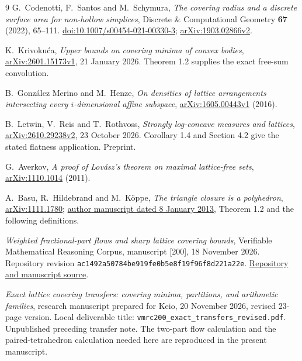 \documentclass[11pt,a4paper]{article}
\theoremstyle{remark}\newtheorem{remark}[theorem]{Remark}
\begin{document}
\begin{thebibliography}{9}
G.~Codenotti, F.~Santos and M.~Schymura,
\emph{The covering radius and a discrete surface area for non-hollow
simplices}, Discrete \& Computational Geometry \textbf{67} (2022),
65--111. \href{https://doi.org/10.1007/s00454-021-00330-3}
{doi:10.1007/s00454-021-00330-3};
\href{https://arxiv.org/abs/1903.02866v2}{arXiv:1903.02866v2}.

K.~Krivoku\'ca, \emph{Upper bounds on covering minima of convex bodies},
\href{https://arxiv.org/abs/2601.15173v1}{arXiv:2601.15173v1},
21 January 2026. Theorem 1.2 supplies the exact free-sum convolution.

B.~Gonz\'alez Merino and M.~Henze,
\emph{On densities of lattice arrangements intersecting every
$i$-dimensional affine subspace},
\href{https://arxiv.org/abs/1605.00443v1}{arXiv:1605.00443v1} (2016).

B.~Letwin, V.~Reis and T.~Rothvoss,
\emph{Strongly log-concave measures and lattices},
\href{https://arxiv.org/abs/2610.29238v2}{arXiv:2610.29238v2},
23 October 2026. Corollary 1.4 and Section 4.2 give the stated
flatness application. Preprint.

G.~Averkov, \emph{A proof of Lov\'asz's theorem on maximal
lattice-free sets},
\href{https://arxiv.org/abs/1110.1014}{arXiv:1110.1014} (2011).

A.~Basu, R.~Hildebrand and M.~K\"oppe,
\emph{The triangle closure is a polyhedron},
\href{https://arxiv.org/abs/1111.1780}{arXiv:1111.1780};
\href{https://www.ams.jhu.edu/~abasu9/papers/polyhedrality_of_triangles.pdf}
{author manuscript dated 8 January 2013}, Theorem 1.2 and the
following definitions.

\emph{Weighted fractional-part flows and sharp lattice covering bounds},
Verifiable Mathematical Reasoning Corpus, manuscript [200],
18 November 2026. Repository revision
\texttt{ac1492a50784be919fe0b5e8f19f96f8d221a22e}.
\href{https://github.com/QEEDDD/Verifiable-Mathematical-Reasoning-Corpus}
{Repository and manuscript source}.

\emph{Exact lattice covering transfers: covering minima, partitions,
and arithmetic families}, research manuscript prepared for Keio,
20 November 2026, revised 23-page version.
Local deliverable title: \texttt{vmrc200\_exact\_transfers\_revised.pdf}.
Unpublished preceding transfer note. The two-part flow calculation
and the paired-tetrahedron calculation needed here are reproduced
in the present manuscript.
\end{thebibliography}
\end{document}
